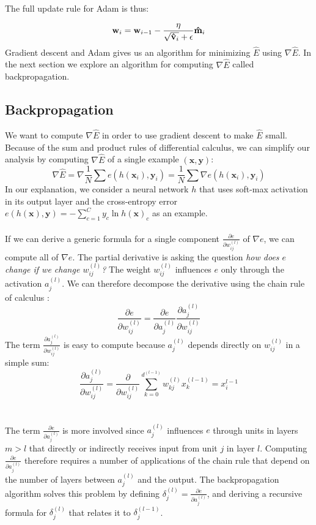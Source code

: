 The full update rule for Adam is thus:

$$
\mathbf{w}_i = \mathbf{w}_{i - 1} - \frac{\eta}{\sqrt{\mathbf{\hat{v}}_i} + \epsilon} \mathbf{\hat{m}}_i
$$
Gradient descent and Adam gives us an algorithm for minimizing $\hat{E}$ using $\nabla\hat{E}$. In the next section we explore an algorithm for computing $\nabla\hat{E}$ called backpropagation.

\subsection{Backpropagation}
We want to compute $\nabla\hat{E}$ in order to use gradient descent to make $\hat{E}$ small. Because of the sum and product rules of differential calculus, we can simplify our analysis by computing $\nabla\hat{E}$ of a single example $(\mathbf{x}, \mathbf{y})$:
$$
\nabla \hat{E} = \nabla \frac{1}{N}\sum e(h(\mathbf{x}_i), \mathbf{y}_i) = \frac{1}{N}\sum \nabla e(h(\mathbf{x}_i), \mathbf{y}_i)
$$
In our explanation, we consider a neural network $h$ that uses soft-max activation in its output layer and the cross-entropy error $e(h(\mathbf{x}), \mathbf{y}) = -\sum_{c=1}^Cy_c \ln h(\mathbf{x})_c$ as an example. 
\\\\
If we can derive a generic formula for a single component $\frac{\partial e}{\partial w^{(l)}_{ij}}$ of $\nabla e$, we can compute all of $\nabla e$. The partial derivative is asking the question \textit{how does $e$ change if we change $w^{(l)}_{ij}$?} The weight $w^{(l)}_{ij}$ influences $e$ only through the activation $a^{(l)}_{j}$. We can therefore decompose the derivative using the chain rule of calculus \citep{yaser12}:
$$
\frac{\partial e}{\partial w^{(l)}_{ij}} = \frac{\partial e}{\partial a^{(l)}_j} \frac{\partial a^{(l)}_j}{\partial w^{(l)}_{ij}}
$$
The term $\frac{\partial a^{(l)}_j}{\partial w^{(l)}_{ij}}$ is easy to compute because $a^{(l)}_{j}$ depends directly on $w^{(l)}_{ij}$ in a simple sum:
$$
\frac{\partial a^{(l)}_j}{\partial w^{(l)}_{ij}} = \frac{\partial}{\partial w^{(l)}_{ij}} \sum\limits_{k=0}^{d^{(l-1)}} w^{(l)}_{kj} x^{(l-1)}_{k} = x^{l-1}_{i}
$$
\\\\
The term $\frac{\partial e}{\partial a^{(l)}_j}$ is more involved since $a^{(l)}_j$ influences $e$ through units in layers $m > l$ that directly or indirectly receives input from unit $j$ in layer $l$. Computing $\frac{\partial e}{\partial a^{(l)}_j}$ therefore requires a number of applications of the chain rule that depend on the number of layers between $a^{(l)}_j$ and the output. The backpropagation algorithm solves this problem by defining $\delta^{(l)}_j = \frac{\partial e}{\partial a^{(l)}_j}$, and deriving a recursive formula for $\delta^{(l)}_{j}$ that relates it to $\delta^{(l-1)}_j$.

